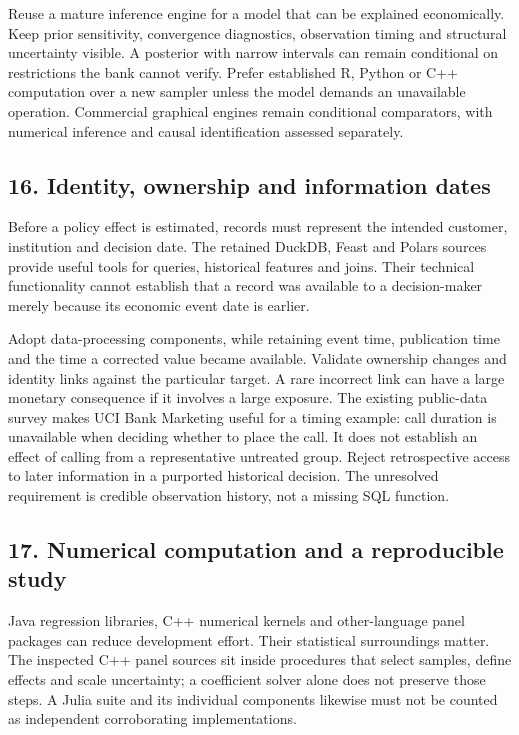 Reuse a mature inference engine for a model that can be explained economically.
Keep prior sensitivity, convergence diagnostics, observation timing and
structural uncertainty visible. A posterior with narrow intervals can remain
conditional on restrictions the bank cannot verify. Prefer established R,
Python or C++ computation over a new sampler unless the model demands an
unavailable operation. Commercial graphical engines remain conditional
comparators, with numerical inference and causal identification assessed
separately.

\subsection{16. Identity, ownership and information dates}
Before a policy effect is estimated, records must represent the intended
customer, institution and decision date. The retained DuckDB, Feast and Polars
sources provide useful tools for queries, historical features and joins.
Their technical functionality cannot establish that a record was available
to a decision-maker merely because its economic event date is earlier.
\citep{exec19_duckdb_source,exec19_feast_source,exec23_polars_sources}

Adopt data-processing components, while retaining event time, publication time
and the time a corrected value became available. Validate ownership changes and
identity links against the particular target. A rare incorrect link can have
a large monetary consequence if it involves a large exposure. The existing
public-data survey makes UCI Bank Marketing useful for a timing example:
call duration is unavailable when deciding whether to place the call. It does
not establish an effect of calling from a representative untreated group.
\citep{pd15_uci_bank}
Reject retrospective access to later information in a purported historical
decision. The unresolved requirement is credible observation history, not a
missing SQL function.

\subsection{17. Numerical computation and a reproducible study}
Java regression libraries, C++ numerical kernels and other-language panel
packages can reduce development effort. Their statistical surroundings matter.
The inspected C++ panel sources sit inside procedures that select samples,
define effects and scale uncertainty; a coefficient solver alone does not
preserve those steps. A Julia suite and its individual components likewise
must not be counted as independent corroborating implementations.
\citep{exec25_paneljava_commons,exec25_panelcxx_fixest,
exec25_panelcxx_xhdfe,exec25_panelother_julia}

